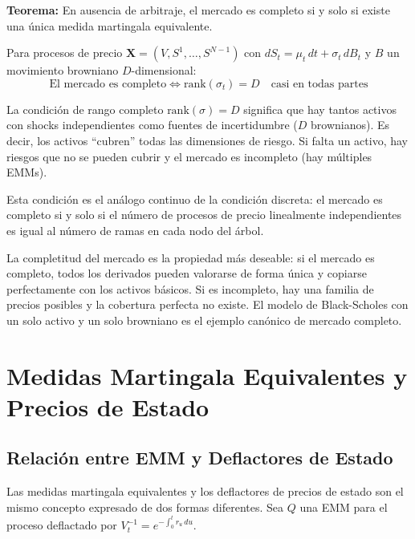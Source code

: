 \documentclass[12pt]{article}
\begin{document}
\textbf{Teorema:} En ausencia de arbitraje, el mercado es completo si y solo si existe una \'unica medida martingala equivalente.

Para procesos de precio $\mathbf{X} = (V, S^1, \ldots, S^{N-1})$ con $dS_t = \mu_t\,dt + \sigma_t\,dB_t$ y $B$ un movimiento browniano $D$-dimensional:
\begin{equation}
  \text{El mercado es completo} \iff \text{rank}(\sigma_t) = D \quad \text{casi en todas partes}
\end{equation}

\begin{intuicionmat}
La condici\'on de rango completo $\text{rank}(\sigma) = D$ significa que hay tantos activos con shocks independientes como fuentes de incertidumbre ($D$ brownianos). Es decir, los activos ``cubren'' todas las dimensiones de riesgo. Si falta un activo, hay riesgos que no se pueden cubrir y el mercado es incompleto (hay m\'ultiples EMMs).
\end{intuicionmat}

Esta condici\'on es el an\'alogo continuo de la condici\'on discreta: el mercado es completo si y solo si el n\'umero de procesos de precio linealmente independientes es igual al n\'umero de ramas en cada nodo del \'arbol.

\begin{intuicion}
La completitud del mercado es la propiedad m\'as deseable: si el mercado es completo, todos los derivados pueden valorarse de forma \'unica y copiarse perfectamente con los activos b\'asicos. Si es incompleto, hay una familia de precios posibles y la cobertura perfecta no existe. El modelo de Black-Scholes con un solo activo y un solo browniano es el ejemplo can\'onico de mercado completo.
\end{intuicion}

\section{Medidas Martingala Equivalentes y Precios de Estado}

\subsection{Relaci\'on entre EMM y Deflactores de Estado}

Las medidas martingala equivalentes y los deflactores de precios de estado son el mismo concepto expresado de dos formas diferentes. Sea $Q$ una EMM para el proceso deflactado por $V_t^{-1} = e^{-\int_0^t r_u\,du}$.
\end{document}
